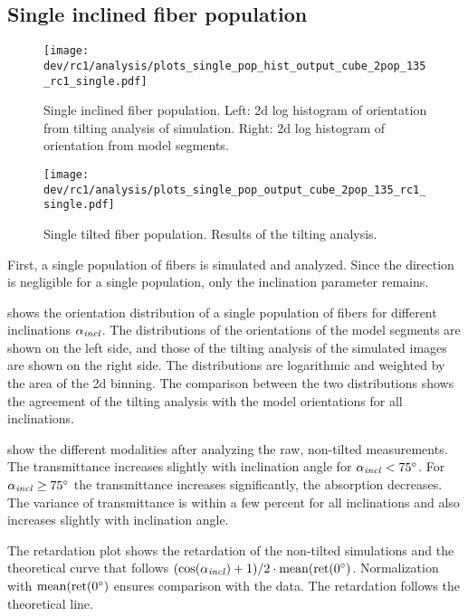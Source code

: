 \subsection{Single inclined fiber population}
\label{sec:resSingleIncl}
%
\begin{figure}[!t]
\centering
\texttt{[image: dev/rc1/analysis/plots\_single\_pop\_hist\_output\_cube\_2pop\_135\_rc1\_single.pdf]}
\caption{Single inclined fiber population. Left: 2d log histogram of orientation from tilting analysis of simulation. Right: 2d log histogram of orientation from model segments.}
\label{fig:single_fiber_pop_hist}
\end{figure}
%
\begin{figure}[!p]
\centering
\texttt{[image: dev/rc1/analysis/plots\_single\_pop\_output\_cube\_2pop\_135\_rc1\_single.pdf]}
\caption{Single tilted fiber population. Results of the tilting analysis.}
\label{fig:single_fiber_pop_rofl}
\end{figure}
%
First, a single population of fibers is simulated and analyzed.
Since the direction is negligible for a single population, only the inclination parameter \modelInc{} remains.
\par
%
 shows the orientation distribution of a single population of fibers for different inclinations $\textnormal{$\alpha_{\mathit{incl}}$}{}$.
The distributions of the orientations of the model segments are shown on the left side, and those of the tilting analysis of the simulated images are shown on the right side.
The distributions are logarithmic and weighted by the area of the 2d binning.
The comparison between the two distributions shows the agreement of the tilting analysis with the model orientations for all inclinations.
\par
%
 show the different modalities after analyzing the raw, non-tilted measurements.
The transmittance increases slightly with inclination angle for $\textnormal{$\alpha_{\mathit{incl}}$}<\SI{75}{\degree}$.
For $\textnormal{$\alpha_{\mathit{incl}}$} \ge \SI{75}{\degree}$ the transmittance increases significantly, \ie{} the absorption decreases.
The variance of transmittance is within a few percent for all inclinations and also increases slightly with inclination angle.
\par
%
The retardation plot shows the retardation of the non-tilted simulations and the theoretical curve that follows $(\cos(\textnormal{$\alpha_{\mathit{incl}}$}) + 1) / 2 \cdot \mathrm{mean}(\mathrm{ret}(\SI{0}{\degree})$.
Normalization with $\mathrm{mean}(\mathrm{ret}(\SI{0}{\degree})$ ensures comparison with the data.
The retardation follows the theoretical line.
